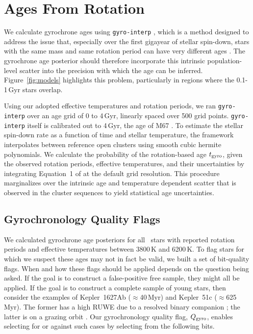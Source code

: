 \documentclass[11pt,twocolumn,tighten]{aastex63}
\begin{document}




\section{Ages From Rotation}
\label{sec:rotage}

We calculate gyrochrone ages using \texttt{gyro-interp}
\citep{Bouma_2023}, which is a method designed to address the issue
that, especially over the first gigayear of stellar spin-down, stars
with the same mass and same rotation period can have very different
ages \citep[e.g.][]{Curtis_2019_ngc6811}.  The gyrochrone age
posterior should therefore incorporate this intrinsic population-level
scatter into the precision with which the age can be inferred.
Figure~\ref{fig:models} highlights this problem, particularly in
regions where the 0.1-1\,Gyr stars overlap.

Using our adopted effective temperatures and rotation periods, we ran
\texttt{gyro-interp} over an age grid of 0 to 4\,Gyr, linearly spaced
over 500 grid points.  \texttt{gyro-interp} itself is calibrated out
to 4\,Gyr, the age of M67
\citep[see][]{2022ApJ...938..118D,Gruner_2023}.  To estimate the
stellar spin-down rate as a function of time and stellar temperature,
the framework interpolates between reference open clusters using
smooth cubic hermite polynomials.  We calculate the probability of the
rotation-based age $t_{\rm gyro}$, given the observed rotation
periods, effective temperatures, and their uncertainties by
integrating Equation~1 of \citet{Bouma_2023} at the default grid
resolution.  This procedure marginalizes over the intrinsic age and
temperature dependent scatter that is observed in the cluster
sequences to yield statistical age uncertainties.


\subsection{Gyrochronology Quality Flags}
\label{subsec:flags}
We calculated gyrochrone age posteriors for all
\nuniqstarsantosrotteffcut\ stars with reported rotation periods and
effective temperatures between 3800\,K and 6200\,K.  To flag stars for
which we suspect these ages may not in fact be valid, we built a set
of bit-quality flags.  When and how these flags should be applied
depends on the question being asked.  If the goal is to construct a
false-positive free sample, they might all be applied.  If the goal is
to construct a complete sample of young stars, then consider the
examples of Kepler~1627Ab ($\approx$40\,Myr) and Kepler~51c
($\approx$625\,Myr).  The former has a high RUWE due to a resolved
binary companion \citep{Bouma_2022a}; the latter is on a grazing orbit
\citep{2014ApJ...783...53M}.  Our gyrochronology quality flag, $Q_{\rm
gyro}$, enables selecting for or against such cases by selecting from
the following bits.
\end{document}
